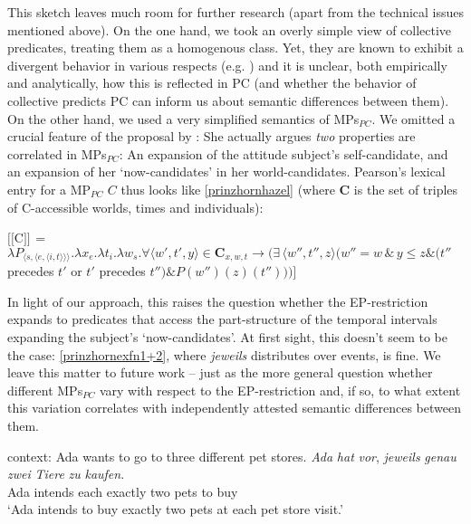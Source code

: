 \documentclass[output=paper,colorlinks,citecolor=brown,
]{langscibook}
\newcommand{\sem}[2]{\mbox{$[\![${#2}$]\!]^{#1}$}} %
\begin{document}
This sketch leaves much room for further research (apart from the technical issues mentioned above). On the one hand, we took an overly simple view of collective predicates, treating them as a homogenous class. Yet, they are known to exhibit a divergent behavior in various respects (e.g. \citealt{Dowty:1986, Landman:2000}) and it is unclear, both empirically and analytically, how this is reflected in PC (and whether the behavior of collective predicts PC can inform us about  semantic differences between them).
On the other hand,  we used a very simplified semantics of MPs$_{PC}$. We omitted a crucial feature of the proposal by \cite{Pearson:2016}: She actually 
 argues \textit{two} properties are correlated in  MPs$_{PC}$: An expansion of the attitude subject's self-candidate, and an expansion of her `now-candidates' in her world-candidates. Pearson's lexical entry for a MP$_{PC}$ $C$ thus looks like \ref{prinzhornhazel} (where \textbf{C} is the set of triples of C-accessible worlds, times and individuals):

\ea \sem{}{C} = $\lambda P_{\langle s, \langle e, \langle i,t \rangle \rangle \rangle}. \lambda x_{e}. \lambda t_{i}. \lambda w_{s}. \forall \langle w',t',y \rangle \in \textbf{C}_{x,w,t} \rightarrow (\exists\, \langle w'', t'', z \rangle (w'' = w \, \& \, y \le z \& (t''$ precedes $t'$ or $t'$ precedes $t'') \& P(w'')(z)(t'')))]$
 \label{prinzhornhazel}\z  
 
In light of our approach, this raises the question whether the EP-restriction expands to predicates that access the part-structure of the temporal intervals expanding the subject's `now-candidates'. At first sight, this doesn't seem to be the case:   \ref{prinzhornexfn1+2}, where \textit{jeweils} distributes over events, is fine. We leave this matter to future work -- just as the more general question  whether different MPs$_{PC}$ vary with respect to the EP-restriction and, if so, to what extent this variation correlates with independently attested semantic differences between them.
 
\ea \label{prinzhornexfn1+2}
\ea \label{prinzhornexfn1} {\sc context: } Ada wants to go to three different pet stores.
\ex \gll \textit{Ada} \textit{hat} \textit{vor}, \textit{jeweils} \textit{genau} \textit{zwei} \textit{Tiere} \textit{zu} \textit{kaufen}.\\
   Ada intends {} each exactly two pets to buy \\
\glt `Ada intends to buy exactly two pets at each pet store visit.' \label{prinzhornexfn2}
\z \z
\end{document}
